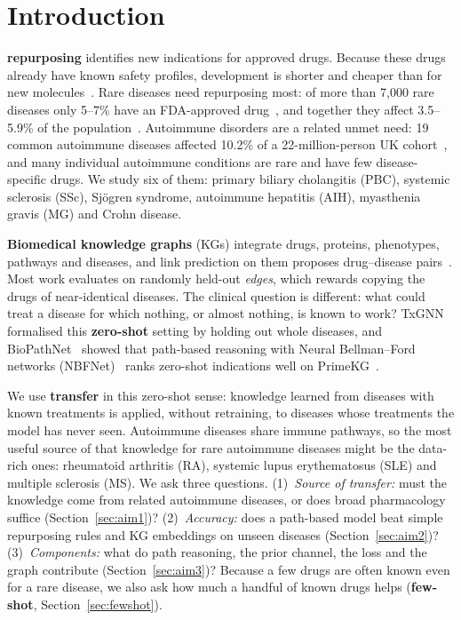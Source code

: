 \documentclass[journal]{IEEEtran}
\begin{document}
\section{Introduction}
 \textbf{repurposing} identifies new indications for approved drugs. Because these drugs already have known safety profiles, development is shorter and cheaper than for new molecules~\cite{pushpakom2019repurposing}. Rare diseases need repurposing most: of more than 7,000 rare diseases only 5--7\% have an FDA-approved drug~\cite{huang2024txgnn}, and together they affect 3.5--5.9\% of the population~\cite{nguengang2020rare}. Autoimmune disorders are a related unmet need: 19 common autoimmune diseases affected 10.2\% of a 22-million-person UK cohort~\cite{conrad2023autoimmune}, and many individual autoimmune conditions are rare and have few disease-specific drugs. We study six of them: primary biliary cholangitis (PBC), systemic sclerosis (SSc), Sj\"ogren syndrome, autoimmune hepatitis (AIH), myasthenia gravis (MG) and Crohn disease.

\textbf{Biomedical knowledge graphs} (KGs) integrate drugs, proteins, phenotypes, pathways and diseases, and link prediction on them proposes drug--disease pairs~\cite{himmelstein2017hetionet,bonner2022review,wei2025kgreview,kumar2025scoping}. Most work evaluates on randomly held-out \emph{edges}, which rewards copying the drugs of near-identical diseases. The clinical question is different: what could treat a disease for which nothing, or almost nothing, is known to work? TxGNN~\cite{huang2024txgnn} formalised this \textbf{zero-shot} setting by holding out whole diseases, and BioPathNet~\cite{hu2026biopathnet} showed that path-based reasoning with Neural Bellman--Ford networks (NBFNet)~\cite{zhu2021nbfnet} ranks zero-shot indications well on PrimeKG~\cite{chandak2023primekg}.

We use \textbf{transfer} in this zero-shot sense: knowledge learned from diseases with known treatments is applied, without retraining, to diseases whose treatments the model has never seen. Autoimmune diseases share immune pathways, so the most useful source of that knowledge for rare autoimmune diseases might be the data-rich ones: rheumatoid arthritis (RA), systemic lupus erythematosus (SLE) and multiple sclerosis (MS). We ask three questions. (1)~\emph{Source of transfer:} must the knowledge come from related autoimmune diseases, or does broad pharmacology suffice (Section~\ref{sec:aim1})? (2)~\emph{Accuracy:} does a path-based model beat simple repurposing rules and KG embeddings on unseen diseases (Section~\ref{sec:aim2})? (3)~\emph{Components:} what do path reasoning, the prior channel, the loss and the graph contribute (Section~\ref{sec:aim3})? Because a few drugs are often known even for a rare disease, we also ask how much a handful of known drugs helps (\textbf{few-shot}, Section~\ref{sec:fewshot}).
\end{document}
